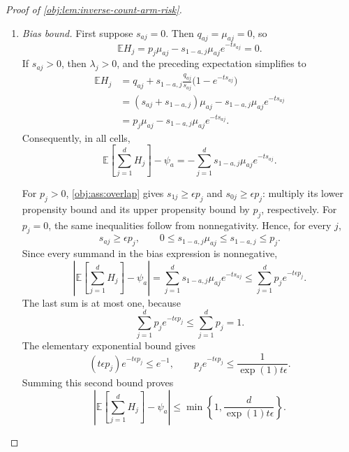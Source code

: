 \begin{proof}[Proof of \cref{obj:lem:inverse-count-arm-risk}]
\begin{enumerate}
\item \emph{Bias bound.}
First suppose \(s_{aj}=0\). Then \(q_{aj}=\mu_{aj}=0\), so
\[
\mathbb E H_j
=p_j\mu_{aj}-s_{1-a,j}\mu_{aj}e^{-t s_{aj}}
=0.
\]
If \(s_{aj}>0\), then \(\lambda_j>0\), and the preceding expectation simplifies to
\[
\begin{aligned}
\mathbb E H_j
&=q_{aj}
+s_{1-a,j}\frac{q_{aj}}{s_{aj}}
  \bigl(1-e^{-t s_{aj}}\bigr)\\
&=(s_{aj}+s_{1-a,j})\mu_{aj}
-s_{1-a,j}\mu_{aj}e^{-t s_{aj}}\\
&=p_j\mu_{aj}-s_{1-a,j}\mu_{aj}e^{-t s_{aj}}.
\end{aligned}
\]
Consequently, in all cells,
\[
\mathbb E\!\left[\sum_{j=1}^{d}H_j\right]-\psi_a
=-\sum_{j=1}^{d}s_{1-a,j}\mu_{aj}e^{-t s_{aj}}.
\]

For \(p_j>0\), \cref{obj:ass:overlap} gives
\(s_{1j}\ge\epsilon p_j\) and \(s_{0j}\ge\epsilon p_j\):
multiply its lower propensity bound and its upper propensity bound by
\(p_j\), respectively. For \(p_j=0\), the same inequalities follow from
nonnegativity. Hence, for every \(j\),
\[
s_{aj}\ge\epsilon p_j,\qquad
0\le s_{1-a,j}\mu_{aj}\le s_{1-a,j}\le p_j.
\]
Since every summand in the bias expression is nonnegative,
\[
\left|\mathbb E\!\left[\sum_{j=1}^{d}H_j\right]-\psi_a\right|
=\sum_{j=1}^{d}s_{1-a,j}\mu_{aj}e^{-t s_{aj}}
\le\sum_{j=1}^{d}p_j e^{-t\epsilon p_j}.
\]
The last sum is at most one, because
\[
\sum_{j=1}^{d}p_j e^{-t\epsilon p_j}
\le\sum_{j=1}^{d}p_j=1.
\]
The elementary exponential bound gives
\[
(t\epsilon p_j)e^{-t\epsilon p_j}\le e^{-1},
\qquad
p_j e^{-t\epsilon p_j}\le\frac1{\exp(1)t\epsilon}.
\]
Summing this second bound proves
\[
\left|\mathbb E\!\left[\sum_{j=1}^{d}H_j\right]-\psi_a\right|
\le
\min\left\{1,\frac{d}{\exp(1)t\epsilon}\right\}.
\]


\end{enumerate}
\end{proof}
